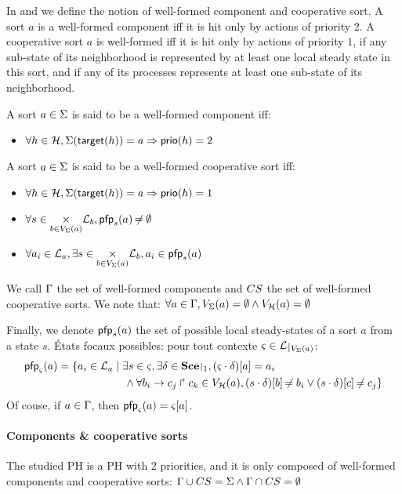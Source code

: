 In  and  we define the notion of well-formed component and cooperative sort.
A sort $a$ is a well-formed component iff
it is hit only by actions of priority $2$.
A cooperative sort $a$ is well-formed iff
it is hit only by actions of priority $1$,
if any sub-state of its neighborhood is represented by at least one local steady state in this sort,
and if any of its processes represents at least one sub-state of its neighborhood.
\begin{definition}
\label{def:component}
  A sort $a \in \Sigma$ is said to be a well-formed component iff:
  \begin{itemize}
    \item $\forall h \in \mathcal{H}, \Sigma(\mathsf{target}(h)) = a \Rightarrow \mathsf{prio}(h) = 2$
  \end{itemize}
\end{definition}
\begin{definition}
  \label{def:cs}
  A sort $a \in \Sigma$ is said to be a well-formed cooperative sort iff:
  \begin{itemize}
    \item $\forall h \in \mathcal{H}, \Sigma(\mathsf{target}(h)) = a \Rightarrow \mathsf{prio}(h) = 1$
    \item $\forall s \in \underset{b \in V_\Sigma(a)}{\times} \mathcal{L}_b, \mathsf{pfp}_s(a) \not\nobreak\mkern -2mu = \emptyset$
    \item $\forall a_i \in \mathcal{L}_a, \exists s \in \underset{b \in V_\Sigma(a)}{\times} \mathcal{L}_b, a_i \in \mathsf{pfp}_s(a)$
  \end{itemize}
\end{definition}
We call $\Gamma$ the set of well-formed components and $CS$ the set of well-formed cooperative sorts.
We note that: $\forall a \in \Gamma, V_\Sigma(a) = \emptyset \wedge V_{\mathcal{H}}(a) = \emptyset$

Finally, we denote $\mathsf{pfp}_s(a)$ the set of possible local steady-states of a sort $a$ from a state $s$.
États focaux possibles: pour tout contexte $\ctx \in \restriction{\PHl}{\Vs(a)}$:
\begin{align*}
  \pfp_\ctx(a) = \{ a_i \in \PHl_a &\mid \exists s \in \ctx, \exists \delta \in \restriction{\Sce}{1}, \PHget{(\ctx \PHplay \delta)}{a} = a_i \\
  & \quad \wedge \forall \PHhit{b_i}{c_j}{c_k} \in \Vh(a), \PHget{(s \PHplay \delta)}{b} \neq b_i \vee \PHget{(s \PHplay \delta)}{c} \neq c_j \}
\end{align*}
Of couse, if $a \in \Gamma$, then $\mathsf{pfp}_\varsigma(a) = {\varsigma[a]}$.

\paragraph{Components \& cooperative sorts}
The studied PH is a PH with 2 priorities, and it is only composed of well-formed components and cooperative sorts:
$\Gamma \cup CS = \Sigma \wedge \Gamma \cap CS = \emptyset$

